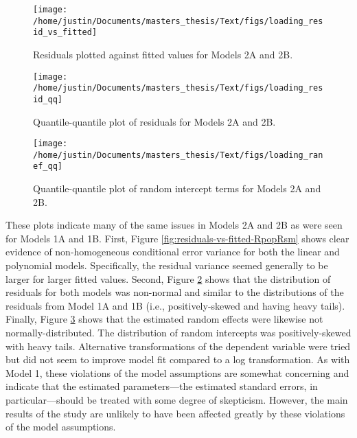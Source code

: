 \documentclass[
  english,
  man]{apa6}
\begin{document}
\begin{appendix}
\begin{figure}
{\centering \texttt{[image: /home/justin/Documents/masters\_thesis/Text/figs/loading\_resid\_vs\_fitted]} 

}

\caption{Residuals plotted against fitted values for Models 2A and 2B.}\label{fig:residuals-vs-fitted-loading-recovery}
\end{figure}

\begin{figure}

{\centering \texttt{[image: /home/justin/Documents/masters\_thesis/Text/figs/loading\_resid\_qq]} 

}

\caption{Quantile-quantile plot of residuals for Models 2A and 2B.}\label{fig:qq-plot-loading-recovery}
\end{figure}

\begin{figure}

{\centering \texttt{[image: /home/justin/Documents/masters\_thesis/Text/figs/loading\_ranef\_qq]} 

}

\caption{Quantile-quantile plot of random intercept terms for Models 2A and 2B.}\label{fig:qq-plot-randInt-loadings}
\end{figure}

These plots indicate many of the same issues in Models 2A and 2B as were
seen for Models 1A and 1B. First, Figure
\ref{fig:residuals-vs-fitted-RpopRsm} shows clear evidence of
non-homogeneous conditional error variance for both the linear and
polynomial models. Specifically, the residual variance seemed generally
to be larger for larger fitted values. Second, Figure
\ref{fig:qq-plot-loading-recovery} shows that the distribution of
residuals for both models was non-normal and similar to the
distributions of the residuals from Model 1A and 1B (i.e.,
positively-skewed and having heavy tails). Finally, Figure
\ref{fig:qq-plot-randInt-loadings} shows that the estimated random
effects were likewise not normally-distributed. The distribution of
random intercepts was positively-skewed with heavy tails. Alternative
transformations of the dependent variable were tried but did not seem to
improve model fit compared to a log transformation. As with Model 1,
these violations of the model assumptions are somewhat concerning and
indicate that the estimated parameters---the estimated standard errors,
in particular---should be treated with some degree of skepticism.
However, the main results of the study are unlikely to have been
affected greatly by these violations of the model assumptions.
\end{appendix}
\end{document}
